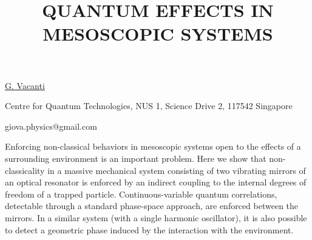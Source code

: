 \title{QUANTUM EFFECTS IN MESOSCOPIC SYSTEMS}

\underline{G. Vacanti}

{\normalsize{\vspace{-4mm}
Centre for Quantum Technologies, NUS 1, Science Drive 2, 117542 Singapore

\email giova.physics@gmail.com}}

Enforcing non-classical behaviors in mesoscopic systems open to the effects of a surrounding environment is an important problem. Here we show that non-classicality in a massive mechanical system consisting of two vibrating mirrors of an optical resonator is enforced by an indirect coupling to the internal degrees of freedom of a trapped particle. Continuous-variable quantum correlations, detectable through a standard phase-space approach, are enforced between the mirrors. In a similar system (with a single harmonic oscillator), it is also possible to detect a geometric phase induced by the interaction with the environment.

\vspace{\baselineskip} 
